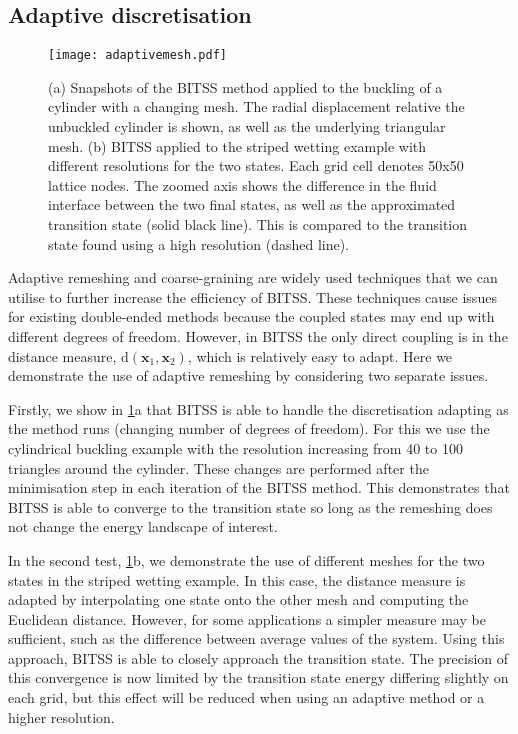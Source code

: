 \documentclass[twocolumn,10pt]{revtex4-2}
\begin{document}
\subsection{Adaptive discretisation}
\begin{figure}[tb]
  \texttt{[image: adaptivemesh.pdf]}
  \caption{\label{fig:adaptivemesh}
    (a) Snapshots of the BITSS method applied to the buckling of a cylinder with a changing mesh.
        The radial displacement relative the unbuckled cylinder is shown, as well as the underlying triangular mesh.
    (b) BITSS applied to the striped wetting example with different resolutions for the two states.
        Each grid cell denotes 50x50 lattice nodes.
        The zoomed axis shows the difference in the fluid interface between the two final states, as well as the approximated transition state (solid black line).
        This is compared to the transition state found using a high resolution (dashed line).
  }
\end{figure}

Adaptive remeshing and coarse-graining are widely used techniques that we can utilise to further increase the efficiency of BITSS.
These techniques cause issues for existing double-ended methods because the coupled states may end up with different degrees of freedom.
However, in BITSS the only direct coupling is in the distance measure, $\mathrm{d}(\bm{x}_1,\bm{x}_2)$, which is relatively easy to adapt.
Here we demonstrate the use of adaptive remeshing by considering two separate issues.

Firstly, we show in \cref{fig:adaptivemesh}a that BITSS is able to handle the discretisation adapting as the method runs (changing number of degrees of freedom).
For this we use the cylindrical buckling example with the resolution increasing from 40 to 100 triangles around the cylinder.
These changes are performed after the minimisation step in each iteration of the BITSS method.
This demonstrates that BITSS is able to converge to the transition state so long as the remeshing does not change the energy landscape of interest.

In the second test, \cref{fig:adaptivemesh}b, we demonstrate the use of different meshes for the two states in the striped wetting example.
In this case, the distance measure is adapted by interpolating one state onto the other mesh and computing the Euclidean distance.
However, for some applications a simpler measure may be sufficient, such as the difference between average values of the system.
Using this approach, BITSS is able to closely approach the transition state.
The precision of this convergence is now limited by the transition state energy differing slightly on each grid, but this effect will be reduced when using an adaptive method or a higher resolution.
\end{document}
